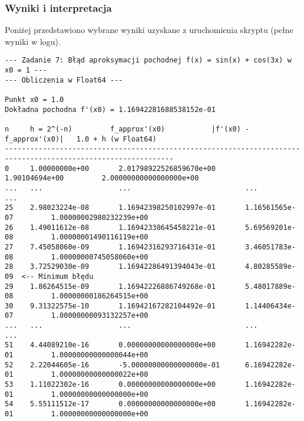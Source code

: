 \documentclass[11pt, a4paper]{article}
\begin{document}
\subsubsection{Wyniki i interpretacja}
Poniżej przedstawiono wybrane wyniki uzyskane z uruchomienia skryptu (pełne wyniki w logu).
\begin{verbatim}
--- Zadanie 7: Błąd aproksymacji pochodnej f(x) = sin(x) + cos(3x) w x0 = 1 ---
--- Obliczenia w Float64 ---

Punkt x0 = 1.0
Dokładna pochodna f'(x0) = 1.16942281688538152e-01

n     h = 2^(-n)         f_approx'(x0)           |f'(x0) - f_approx'(x0)|   1.0 + h (w Float64)
--------------------------------------------------------------------------------------------------------------
0     1.00000000e+00       2.01798922526859670e+00       1.90104694e+00         2.00000000000000000e+00
...   ...                  ...                           ...                    ...
25    2.98023224e-08       1.16942398250102997e-01       1.16561565e-07         1.00000002980232239e+00
26    1.49011612e-08       1.16942338645458221e-01       5.69569201e-08         1.00000001490116119e+00
27    7.45058060e-09       1.16942316293716431e-01       3.46051783e-08         1.00000000745058060e+00
28    3.72529030e-09       1.16942286491394043e-01       4.80285589e-09  <-- Minimum błędu
29    1.86264515e-09       1.16942226886749268e-01       5.48017889e-08         1.00000000186264515e+00
30    9.31322575e-10       1.16942167282104492e-01       1.14406434e-07         1.00000000093132257e+00
...   ...                  ...                           ...                    ...
51    4.44089210e-16       0.00000000000000000e+00       1.16942282e-01         1.00000000000000044e+00
52    2.22044605e-16       -5.00000000000000000e-01      6.16942282e-01         1.00000000000000022e+00
53    1.11022302e-16       0.00000000000000000e+00       1.16942282e-01         1.00000000000000000e+00
54    5.55111512e-17       0.00000000000000000e+00       1.16942282e-01         1.00000000000000000e+00

\end{verbatim}
\end{document}
